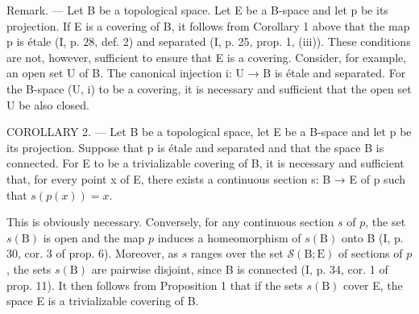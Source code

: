 Remark. --- Let B be a topological space. Let E be a B-space and let p be its projection. If E is a covering of B, it follows from Corollary 1 above that the map p is étale (I, p. 28, def. 2) and separated (I, p. 25, prop. 1, (iii)). These conditions are not, however, sufficient to ensure that E is a covering. Consider, for example, an open set U of B. The canonical injection i: U → B is étale and separated. For the B-space (U, i) to be a covering, it is necessary and sufficient that the open set U be also closed.

COROLLARY 2. --- Let B be a topological space, let E be a B-space and let p be its projection. Suppose that p is étale and separated and that the space B is connected. For E to be a trivializable covering of B, it is necessary and sufficient that, for every point x of E, there exists a continuous section s: B → E of p such that \(s(p(x)) = x\).

This is obviously necessary. Conversely, for any continuous section \(s\) of \(p\), the set \(s(\mathrm{B})\) is open and the map \(p\) induces a homeomorphism of \(s(\mathrm{B})\) onto B (I, p. 30, cor. 3 of prop. 6). Moreover, as \(s\) ranges over the set \(\mathcal{S}(\mathrm{B};\mathrm{E})\) of sections of \(p\), the sets \(s(\mathrm{B})\) are pairwise disjoint, since B is connected (I, p. 34, cor. 1 of prop. 11). It then follows from Proposition 1 that if the sets \(s(\mathrm{B})\) cover E, the space E is a trivializable covering of B.

